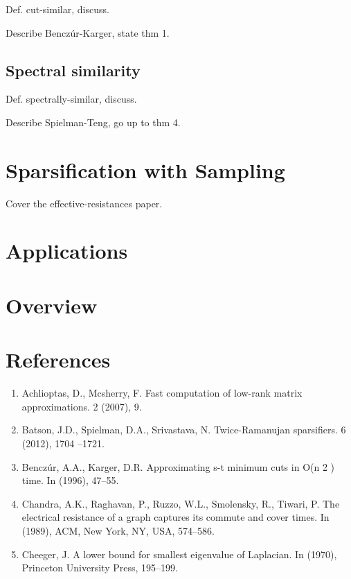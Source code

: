 \documentclass{article}
\begin{document}
Def. cut-similar, discuss.

Describe Benczúr-Karger, state thm 1.

\subsection{Spectral similarity}

Def. spectrally-similar, discuss.

Describe Spielman-Teng, go up to thm 4.

\section{Sparsification with Sampling}

Cover the effective-resistances paper.

\section{Applications}

\section{Overview}

\section*{References}

\begin{enumerate}[1.]
    \item Achlioptas, D., Mcsherry, F. Fast computation of low-rank matrix
approximations. 2 (2007), 9.

    \item Batson, J.D., Spielman, D.A., Srivastava, N.  Twice-Ramanujan
sparsifiers. 6 (2012), 1704 –1721.

    \item Benczúr, A.A., Karger, D.R.  Approximating s-t minimum cuts in O(n 2
) time. In (1996), 47–55.

    \item Chandra, A.K., Raghavan, P., Ruzzo, W.L., Smolensky, R., Tiwari, P.
The electrical resistance of a graph captures its commute and cover times. In
(1989), ACM, New York, NY, USA, 574–586.

    \item Cheeger, J. A lower bound for smallest eigenvalue of Laplacian. In
(1970), Princeton University Press, 195–199.
\end{enumerate}
\end{document}
